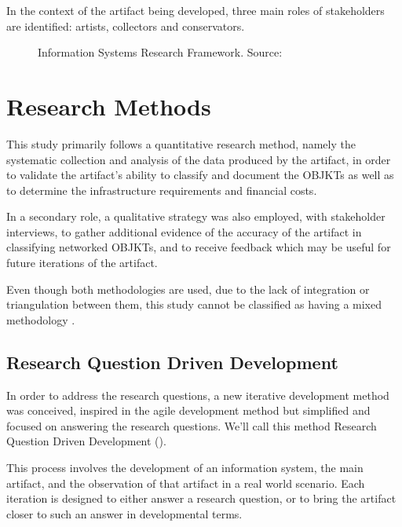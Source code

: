 In the context of the artifact being developed, three main roles of stakeholders are identified: artists, collectors and conservators.

\begin{figure}[h]
    \centering
    
    \caption[Information Systems Research Framework]{Information Systems Research Framework. Source: \cite[p.80]{hevnerDesignScienceInformation2004}}
    \label{fig:is-research-framework}
\end{figure}


\section{Research Methods}

This study primarily follows a quantitative research method, namely the systematic collection and analysis of the data produced by the artifact, in order to validate the artifact's ability to classify and document the OBJKTs as well as to determine the infrastructure requirements and financial costs.

In a secondary role, a qualitative strategy was also employed, with stakeholder interviews, to gather additional evidence of the accuracy of the artifact in classifying networked OBJKTs, and to receive feedback which may be useful for future iterations of the artifact.

Even though both methodologies are used, due to the lack of integration or triangulation between them, this study cannot be classified as having a mixed methodology \cite{turnerResearchDesignMixed2017}.


\subsection{Research Question Driven Development}

In order to address the research questions, a new iterative development method was conceived, inspired in the agile development method \cite{shoreArtAgileDevelopment2021} but simplified and focused on answering the research questions. We'll call this method Research Question Driven Development ().

This process involves the development of an information system, the main artifact, and the observation of that artifact in a real world scenario. Each iteration is designed to either answer a research question, or to bring the artifact closer to such an answer in developmental terms.

